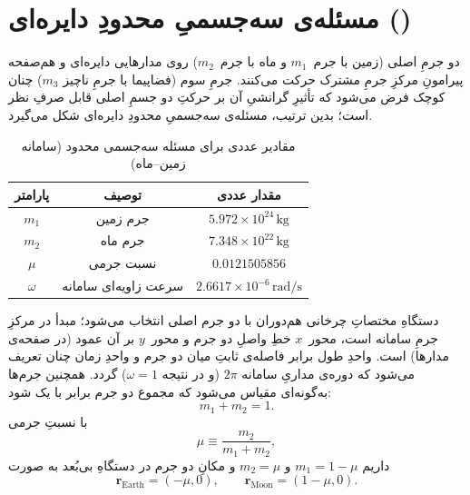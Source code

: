 
\section{مسئله‌ی سه‌جسمیِ محدودِ دایره‌ای ()}\label{sec:crtbp}

دو جرمِ اصلی (زمین
با جرم~$m_{1}$ و ماه با جرم~$m_{2}$) روی مدارهایی دایره‌ای و هم‌صفحه پیرامونِ مرکزِ جرمِ مشترک حرکت می‌کنند. جرمِ سوم (فضاپیما با جرمِ ناچیز $m_{3}$) چنان کوچک فرض می‌شود که تأثیرِ گرانشیِ آن بر حرکتِ دو جسمِ اصلی قابل صرفِ نظر است؛ بدین ترتیب، مسئله‌ی سه‌جسمیِ محدودِ دایره‌ای شکل می‌گیرد.



\begin{table}[H]
	\centering
	\caption{مقادیر عددی برای مسئله سه‌جسمی محدود (سامانه زمین–ماه)}
	\begin{tabular}{|c|c|c|}
		\hline
		پارامتر & توصیف & مقدار عددی \\
		\hline
		$m_1$ & جرم زمین & $5.972 \times 10^{24}\,\mathrm{kg}$ \\
		$m_2$ & جرم ماه & $7.348 \times 10^{22}\,\mathrm{kg}$ \\
		$\mu$ & نسبت جرمی & $0.0121505856$ \\
		$\omega$ & سرعت زاویه‌ای سامانه & $2.6617 \times 10^{-6}\,\mathrm{rad/s}$ \\
		\hline
	\end{tabular}
	\label{tab:params}
\end{table}



دستگاهِ مختصاتِ چرخانی هم‌دوران با دو جرم اصلی انتخاب می‌شود؛ مبدأ در مرکزِ جرمِ سامانه است، محور~$x$ خطِ واصلِ دو جرم و محور~$y$ بر آن عمود (در صفحه‌ی مدارها) است. واحدِ طول برابر فاصله‌ی ثابتِ میان دو جرم و واحدِ زمان چنان تعریف می‌شود که دوره‌ی مداریِ سامانه $2\pi$ (و در نتیجه $\omega=1$) گردد. همچنین جرم‌ها به‌گونه‌ای مقیاس می‌شود که مجموع دو جرم برابر با یک شود:
\begin{equation}
	 m_{1}+m_{2}=1.
\end{equation}
با نسبتِ جرمی
\begin{equation}
	\mu\equiv\frac{m_{2}}{m_{1}+m_{2}},
\end{equation}
داریم $m_{1}=1-\mu$ و $m_{2}=\mu$ و مکانِ دو جرم در دستگاهِ بی‌بُعد به صورت
\begin{equation}
	\mathbf r_{\text{Earth}}=(-\mu,0),\qquad \mathbf r_{\text{Moon}}=(1-\mu,0).
\end{equation}



